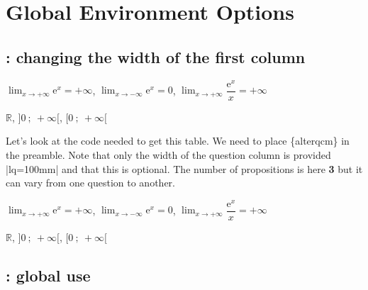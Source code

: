 \section{Global Environment Options  }

\subsection{ : changing the width of the first column }

\begin{alterqcm}[long,lq=110mm]
{{$\displaystyle\lim_{x \to +\infty} \text{e}^x = + \infty$},
{$\displaystyle\lim_{x \to -\infty} \text{e}^x = 0$},
{$\displaystyle\lim_{x \to +\infty} \dfrac{\text{e}^x}{x} = + \infty$}}

{{$\mathbb{R}$},
{$\big]0~;~+ \infty\big[$},
{$\big[0~;~+\infty\big[$}
}
\end{alterqcm}

\medskip
Let's look at the code needed to get this table. We need to place
\{alterqcm\} in the preamble. Note that only the width of the question column is provided |lq=100mm| and that this is optional. The number of propositions is here \textbf{3} but it can vary from one question to another.

\begin{tkzexample}
 \begin{alterqcm}[long,lq=110mm]
  {{$\displaystyle\lim_{x \to +\infty} \text{e}^x = + \infty$},
  {$\displaystyle\lim_{x \to -\infty} \text{e}^x = 0$},
  {$\displaystyle\lim_{x \to +\infty} \dfrac{\text{e}^x}{x} = + \infty$}}
  
  {{$\mathbb{R}$},
  {$\big]0~;~+ \infty\big[$},
  {$\big[0~;~+\infty\big[$}
  }
  \end{alterqcm}\end{tkzexample}



\subsection{ : global use }

